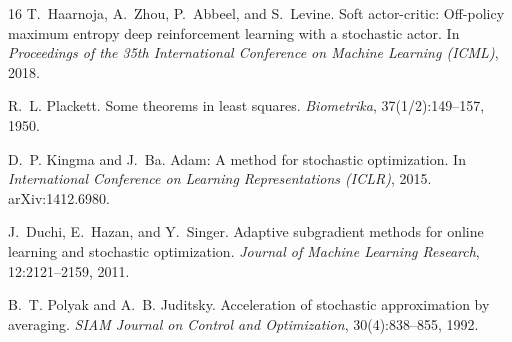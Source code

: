 \documentclass[11pt]{article}
\begin{document}
\begin{thebibliography}{16}
T.~Haarnoja, A.~Zhou, P.~Abbeel, and S.~Levine.
\newblock Soft actor-critic: Off-policy maximum entropy deep reinforcement learning with a
  stochastic actor.
\newblock In \emph{Proceedings of the 35th International Conference on Machine Learning
  (ICML)}, 2018.

R.~L. Plackett.
\newblock Some theorems in least squares.
\newblock \emph{Biometrika}, 37(1/2):149--157, 1950.

D.~P. Kingma and J.~Ba.
\newblock Adam: A method for stochastic optimization.
\newblock In \emph{International Conference on Learning Representations (ICLR)}, 2015.
\newblock arXiv:1412.6980.

J.~Duchi, E.~Hazan, and Y.~Singer.
\newblock Adaptive subgradient methods for online learning and stochastic optimization.
\newblock \emph{Journal of Machine Learning Research}, 12:2121--2159, 2011.

B.~T. Polyak and A.~B. Juditsky.
\newblock Acceleration of stochastic approximation by averaging.
\newblock \emph{SIAM Journal on Control and Optimization}, 30(4):838--855, 1992.

\end{thebibliography}
\end{document}
